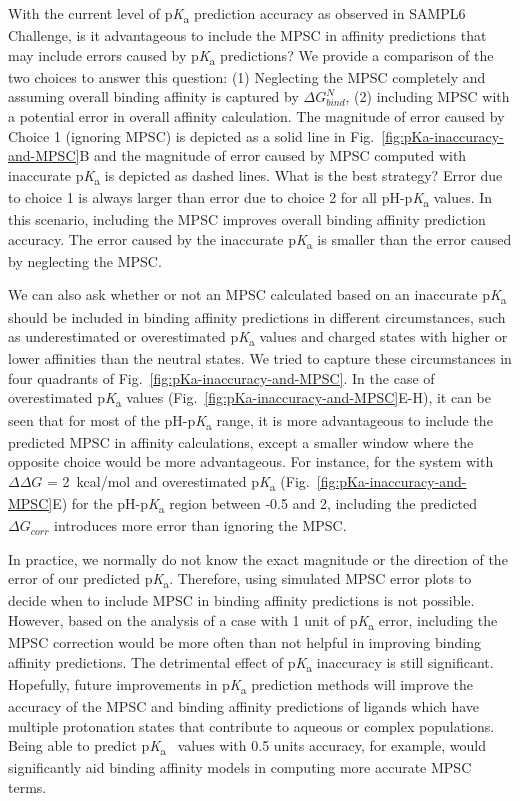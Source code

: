 \documentclass[9pt,lineno,final]{elife}
\newcommand{\pKa}{p\textit{K}\textsubscript{a}}
\begin{document}
With the current level of \pKa{} prediction accuracy as observed in SAMPL6 Challenge, is it advantageous to include the MPSC in affinity predictions that may include errors caused by \pKa{} predictions? 
We provide a comparison of the two choices to answer this question: (1) Neglecting the MPSC completely and assuming overall binding affinity is captured by $\Delta G_{bind}^{N}$, (2) including MPSC with a potential error in overall affinity calculation. 
The magnitude of error caused by Choice 1 (ignoring MPSC) is depicted as a solid line in Fig.~\ref{fig:pKa-inaccuracy-and-MPSC}B and the magnitude of error caused by MPSC computed with inaccurate \pKa{}  is depicted as dashed lines. 
What is the best strategy? 
Error due to choice 1 is always larger than error due to choice 2 for all pH-\pKa{} values. 
In this scenario, including the MPSC improves overall binding affinity prediction accuracy.
The error caused by the inaccurate \pKa{} is smaller than the error caused by neglecting the MPSC. 

We can also ask whether or not an MPSC calculated based on an inaccurate \pKa{} should be included in binding affinity predictions in different circumstances, such as underestimated or overestimated \pKa{} values and charged states with higher or lower affinities than the neutral states. 
We tried to capture these circumstances in four quadrants of Fig.~\ref{fig:pKa-inaccuracy-and-MPSC}. 
In the case of overestimated \pKa{} values (Fig.~\ref{fig:pKa-inaccuracy-and-MPSC}E-H), it can be seen that for most of the pH-\pKa{} range, it is more advantageous to include the predicted MPSC in affinity calculations, except a smaller window where the opposite choice would be more advantageous. 
For instance, for the system with $\Delta\Delta G$ = 2~kcal/mol and overestimated \pKa{} (Fig.~\ref{fig:pKa-inaccuracy-and-MPSC}E) for the pH-\pKa{} region between -0.5 and 2, including the predicted $\Delta G_{corr}$ introduces more error than ignoring the MPSC. 

In practice, we normally do not know the exact magnitude or the direction of the error of our predicted \pKa{}. 
Therefore, using simulated MPSC error plots to decide when to include MPSC in binding affinity predictions is not possible. 
However, based on the analysis of a case with 1 unit of \pKa{} error, including the MPSC correction would be more often than not helpful in improving binding affinity predictions. 
The detrimental effect of \pKa{} inaccuracy is still significant. 
Hopefully, future improvements in \pKa{} prediction methods will improve the accuracy of the MPSC and binding affinity predictions of ligands which have multiple protonation states that contribute to aqueous or complex populations. 
Being able to predict \pKa{}~ values with 0.5 units accuracy, for example, would significantly aid binding affinity models in computing more accurate MPSC terms.   
\end{document}
